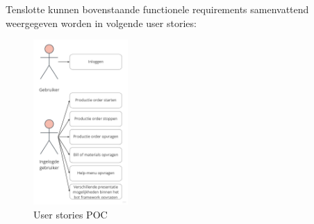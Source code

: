 Tenslotte kunnen bovenstaande functionele requirements samenvattend weergegeven worden in volgende user stories: 

\begin{figure}[h]
    \centering
    \includegraphics[width=0.32\textwidth]{img/UserStories.jpg}
    \caption{User stories POC }
\end{figure}


 
